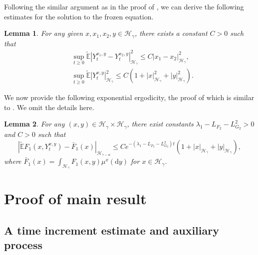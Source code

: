 \documentclass[10pt,a4paper]{article}
\newtheorem{lemma}{Lemma}[section]
\numberwithin{equation}{section}
\begin{document}
Following the similar argument as in the proof of \cite[Lemma 4.5]{LLPX25},
we can derive the following estimates for the solution to the frozen equation.
\begin{lemma}\label{lem3.4}
	For any given $x,x_1,x_2,y\in \mathcal{H}_\gamma$, there exists a constant $C>0$ such that
	\begin{align}
		&\sup_{t\geq0}\widetilde{\mathbb E}|Y_t^{x_1,y}-Y_t^{x_2,y}|_{\mathcal{H}_\gamma}^2\leq C|x_1-x_2|_{\mathcal{H}_\gamma }^2, \label{frozendifference}\\
		&\sup_{t\geq0}\widetilde{\mathbb E}|Y^{x,y}_t|_{\mathcal{H}_\gamma}^2\leq C(1+|x|_{\mathcal{H}_\gamma }^2+|y|_{\mathcal{H}_\gamma}^2).\label{frozenest}
	\end{align}
\end{lemma}





We now provide the following exponential ergodicity, the proof of which is similar to \cite[Proposition 4.2]{HLL22}. We omit the details here.



\begin{lemma}\label{ergo}
For any $(x,y) \in \mathcal H_\gamma \times \mathcal H_\gamma$, there exist constants $\lambda_1-L_{F_2}-L_{G_2}^2>0$ and $C> 0$ such that
$$|\widetilde{\mathbb E}F_1(x, Y_t^{x,y})-\bar{F}_1(x)|_{\mathcal H_{\gamma-\alpha} }\leq C e^{ -(\lambda_1-L_{F_2}-L_{G_2}^2) t} (1+| x |_{\mathcal H_\gamma }+| y |_{\mathcal H_\gamma }),$$
where $\bar{F}_1 (x)=\displaystyle\int_{\mathcal{H}_\gamma} F_1 (x,y) \mu^x (\mathrm{d}y)$ for $x\in\mathcal{H}_\gamma$.
\end{lemma}













\section{Proof of main result}\label{sect4}




\subsection{A time increment estimate and auxiliary process}\label{fro}
\end{document}
